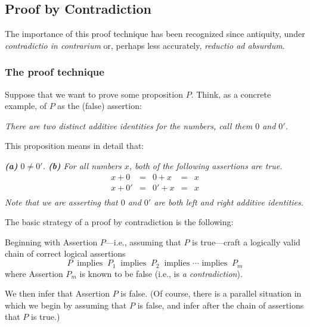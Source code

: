 \subsection{Proof by Contradiction}
\label{sec:Contradiction}

The importance of this proof technique has been recognized since antiquity, under  {\em contradictio in contrarium} or, perhaps less accurately, {\em reductio ad absurdum}.

\subsubsection{The proof technique}
\label{sec:contradiction-technique}

Suppose that we want to prove some proposition $P$.  Think, as a concrete example, of $P$ as the (false) assertion:

\medskip

{\em There are two distinct {\em additive identities} for the numbers, call them $0$ and $0'$.}

\smallskip

\noindent
This proposition means in detail that:

\smallskip

{\em {\bf (a)} $0 \neq 0'$.  {\bf (b)} For all numbers $x$, both of the following assertions are true.}
\[ \begin{array}{ccccc}
x + 0 & = & 0 + x & = & x \\
x + 0' & = & 0' + x & = & x \\
\end{array}
\]
{\em Note that we are asserting that $0$ and $0'$ are both left and right additive identities.}

\medskip

\noindent
The basic strategy of a proof by contradiction is the following:

\smallskip

Beginning with Assertion $P$---i.e., assuming that $P$ is true---craft a logically valid chain of correct logical assertions
\[ P \ \mbox{ implies } \ P_1  \ \mbox{ implies } \ P_2  \ 
\mbox{ implies } \cdots \mbox{ implies } \ P_m
\]
where Assertion $P_m$ is known to be false (i.e., is {\it a contradiction}).

\medskip

\noindent
We then infer that Assertion $P$ is false.  (Of course, there is a parallel situation in which we begin by assuming that $P$ is false, and infer after the chain of assertions that $P$ is true.)

